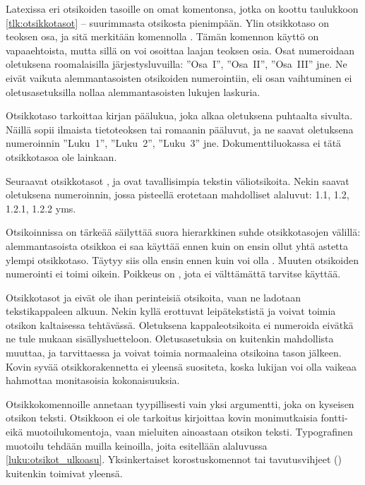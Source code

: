 Latexissa eri otsikoiden tasoille on omat komentonsa, jotka on koottu
taulukkoon \ref{tlk:otsikkotasot} -- suurimmasta otsikosta pienimpään.
Ylin otsikkotaso on teoksen osa, ja sitä merkitään komennolla
. Tämän komennon käyttö on vapaaehtoista, mutta sillä on
voi osoittaa laajan teoksen osia. Osat numeroidaan oletuksena
roomalaisilla järjestysluvuilla: ''Osa~I'', ''Osa~II'', ''Osa~III'' jne.
Ne eivät vaikuta alemmantasoisten otsikoiden numerointiin, eli osan
vaihtuminen ei oletusasetuksilla nollaa alemmantasoisten lukujen
laskuria.

Otsikkotaso  tarkoittaa kirjan päälukua, joka alkaa
oletuksena puhtaalta sivulta. Näillä sopii ilmaista tietoteoksen tai
romaanin pääluvut, ja ne saavat oletuksena numeroinnin ''Luku~1'',
''Luku~2'', ''Luku~3'' jne. Dokumenttiluokassa  ei tätä
otsikkotasoa ole lainkaan.

Seuraavat otsikkotasot ,  ja
 ovat tavallisimpia tekstin väliotsikoita. Nekin
saavat oletuksena numeroinnin, jossa pisteellä erotetaan mahdolliset
alaluvut: 1.1, 1.2, 1.2.1, 1.2.2 yms.

Otsikoinnissa on tärkeää säilyttää suora hierarkkinen suhde
otsikkotasojen välillä: alemmantasoista otsikkoa ei saa käyttää ennen
kuin on ensin ollut yhtä astetta ylempi otsikkotaso. Täytyy siis olla
ensin  ennen kuin voi olla . Muuten
otsikoiden numerointi ei toimi oikein. Poikkeus on , jota
ei välttämättä tarvitse käyttää.

Otsikkotasot  ja  eivät ole
ihan perinteisiä otsikoita, vaan ne ladotaan tekstikappaleen alkuun.
Nekin kyllä erottuvat leipätekstistä ja voivat toimia otsikon
kaltaisessa tehtävässä. Oletuksena kappaleotsikoita ei numeroida eivätkä
ne tule mukaan sisällysluetteloon. Oletusasetuksia on kuitenkin
mahdollista muuttaa, ja tarvittaessa  ja
 voivat toimia normaaleina otsikoina tason
 jälkeen. Kovin syvää otsikkorakennetta ei
yleensä suositeta, koska lukijan voi olla vaikeaa hahmottaa monitasoisia
kokonaisuuksia.

Otsikkokomennoille annetaan tyypillisesti vain yksi argumentti, joka on
kyseisen otsikon teksti. Otsikkoon ei ole tarkoitus kirjoittaa kovin
monimutkaisia fontti- eikä muotoilukomentoja, vaan mieluiten ainoastaan
otsikon teksti. Typografinen muotoilu tehdään muilla keinoilla, joita
esitellään alaluvussa \ref{luku:otsikot_ulkoasu}. Yksinkertaiset
korostuskomennot tai tavutusvihjeet (\komento{-}) kuitenkin toimivat
yleensä.

